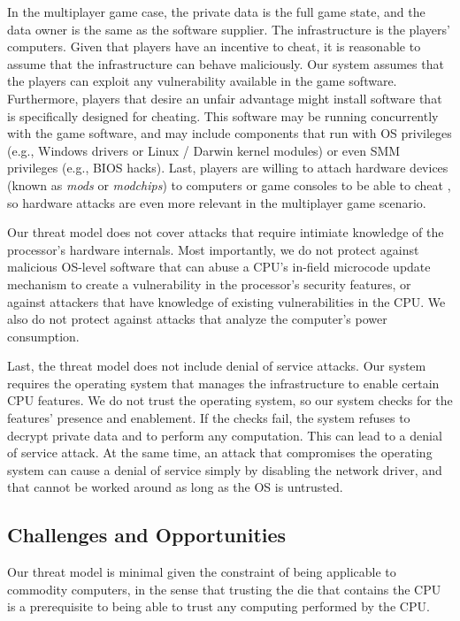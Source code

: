 In the multiplayer game case, the private data is the full game state, and the
data owner is the same as the software supplier. The infrastructure is the
players' computers. Given that players have an incentive to cheat, it is
reasonable to assume that the infrastructure can behave maliciously. Our system
assumes that the players can exploit any vulnerability available in the game
software. Furthermore, players that desire an unfair advantage might install
software that is specifically designed for cheating. This software may be
running concurrently with the game software, and may include components that
run with OS privileges (e.g., Windows drivers or Linux / Darwin kernel
modules) or even SMM privileges (e.g., BIOS hacks). Last, players are willing
to attach hardware devices (known as \textit{mods} or \textit{modchips}) to
computers or game consoles to be able to cheat \cite{harris2007mod}, so
hardware attacks are even more relevant in the multiplayer game scenario.

Our threat model does not cover attacks that require intimiate knowledge of the
processor's hardware internals. Most importantly, we do not protect against
malicious OS-level software that can abuse a CPU's in-field microcode update
mechanism to create a vulnerability in the processor's security features, or
against attackers that have knowledge of existing vulnerabilities in the CPU.
We also do not protect against attacks that analyze the computer's power
consumption.

Last, the threat model does not include denial of service attacks. Our system
requires the operating system that manages the infrastructure to enable certain
CPU features. We do not trust the operating system, so our system checks for
the features' presence and enablement. If the checks fail, the system refuses
to decrypt private data and to perform any computation. This can lead to a
denial of service attack. At the same time, an attack that compromises the
operating system can cause a denial of service simply by disabling the network
driver, and that cannot be worked around as long as the OS is untrusted.


\subsection{Challenges and Opportunities}

Our threat model is minimal given the constraint of being applicable to
commodity computers, in the sense that trusting the die that contains the CPU
is a prerequisite to being able to trust any computing performed by the CPU.

